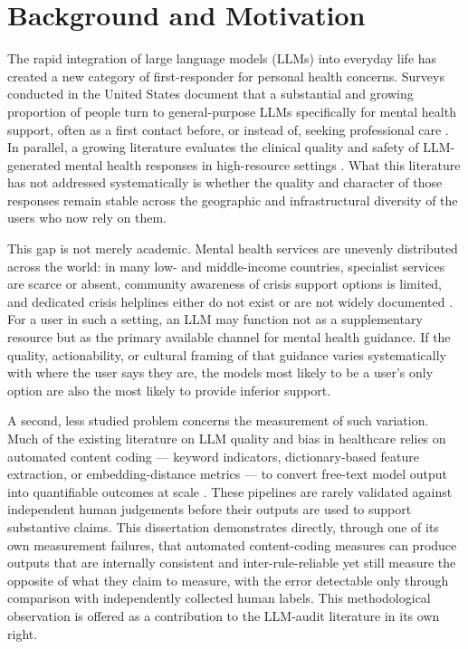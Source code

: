 \section{Background and Motivation}

The rapid integration of large language models (LLMs) into everyday life has created a new category of first-responder for personal health concerns. Surveys conducted in the United States document that a substantial and growing proportion of people turn to general-purpose LLMs specifically for mental health support, often as a first contact before, or instead of, seeking professional care \citep{rousmaniere2025mentalhealth}. In parallel, a growing literature evaluates the clinical quality and safety of LLM-generated mental health responses in high-resource settings \citep{hua2025mentalhealth, santos2026clinical, saha2025linguistic}. What this literature has not addressed systematically is whether the quality and character of those responses remain stable across the geographic and infrastructural diversity of the users who now rely on them.

This gap is not merely academic. Mental health services are unevenly distributed across the world: in many low- and middle-income countries, specialist services are scarce or absent, community awareness of crisis support options is limited, and dedicated crisis helplines either do not exist or are not widely documented \citep{osborn2024students}. For a user in such a setting, an LLM may function not as a supplementary resource but as the primary available channel for mental health guidance. If the quality, actionability, or cultural framing of that guidance varies systematically with where the user says they are, the models most likely to be a user's only option are also the most likely to provide inferior support.

A second, less studied problem concerns the measurement of such variation. Much of the existing literature on LLM quality and bias in healthcare relies on automated content coding --- keyword indicators, dictionary-based feature extraction, or embedding-distance metrics --- to convert free-text model output into quantifiable outcomes at scale \citep{dai2023llm, depaoli2024thematic}. These pipelines are rarely validated against independent human judgements before their outputs are used to support substantive claims. This dissertation demonstrates directly, through one of its own measurement failures, that automated content-coding measures can produce outputs that are internally consistent and inter-rule-reliable yet still measure the opposite of what they claim to measure, with the error detectable only through comparison with independently collected human labels. This methodological observation is offered as a contribution to the LLM-audit literature in its own right.

